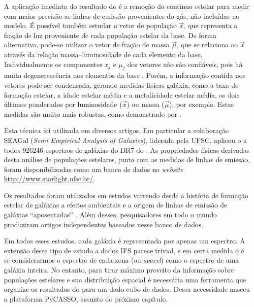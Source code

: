 A aplicação imediata do resultado do \starlight é a remoção do contínuo estelar
para medir com maior precisão as linhas de emissão provenientes do gás, não
incluídas no modelo. É possível também estudar o vetor de população $\vec{x}$,
que representa a fração de luz proveniente de cada população estelar da base. De
forma alternativa, pode-se utilizar o vetor de fração de massa $\vec{\mu}$, que
se relaciona ao $\vec{x}$ através da relação massa--luminosidade de cada
elemento da base. Individualmente os componentes $x_j$ e $\mu_j$ dos vetores não
são confiáveis, pois há muita degenerescência nos elementos da base
\citep{CidFernandes2005}. Porém, a informação contida nos vetores pode ser
condensada, gerando medidas físicas galáxia, como a taxa de formação estelar, a
idade estelar média e a metalicidade estelar média, os dois últimos ponderados
por luminosidade ($\vec{x}$) ou massa ($\vec{\mu}$), por exemplo. Estas medidas
são muito mais robustas, como  demonstrado por \citet{CidFernandes2014}.

Esta técnica foi utilizada em diversos artigos. Em particular a colaboração
SEAGal ({\em Semi Empirical Analysis of Galaxies}), liderada pela UFSC, aplicou
o \starlight a todos  926246 espectros de galáxias do DR7 do \SDSS. As
propriedades físicas derivadas desta análise de populações estelares, junto com
as medidas de linhas de emissão, foram disponibilizadas como um banco de dados
no {\em website} \url{http://www.starlight.ufsc.br/}.

Os resultados foram utilizados em estudos varrendo desde a história de formação
estelar de galáxias \citep{Asari2007} a efeitos ambientais \citep{Mateus2007} e
a origem de linhas de emissão de galáxias ``aposentadas'' \citep{Stasinska2008,
CidFernandes2011}. Além desses, pesquisadores em todo o mundo produziram artigos
independentes \citep[para citar alguns]{Bian2006, Liang2007, Peeples2009,
Lara-Lopez2009, Lara-Lopez2010} baseados nesse banco de dados.

Em todos esses estudos, cada galáxia é representada por apenas um espectro. A
extensão desse tipo de estudo a dados IFS parece trivial, e em certa medida o é
se considerarmos o espectro de cada zona (ou {\em spaxel}) como o espectro de
uma galáxia inteira. No entanto, para tirar máximo proveito da informação sobre
populações estelares e sua distribuição espacial é necessária uma ferramenta que
organize os resultados do \starlight para um dado cubo de dados. Dessa
necessidade nasceu a plataforma PyCASSO, assunto do próximo capítulo.


